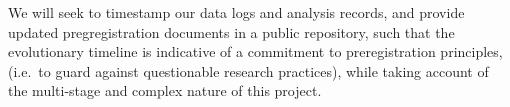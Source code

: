 \documentclass[
]{article}
\begin{document}
We will seek to timestamp our data logs and analysis records, and
provide updated pregregistration documents in a public repository, such
that the evolutionary timeline is indicative of a commitment to
preregistration principles, (i.e.~to guard against questionable research
practices), while taking account of the multi-stage and complex nature
of this project.

\newpage
\end{document}
